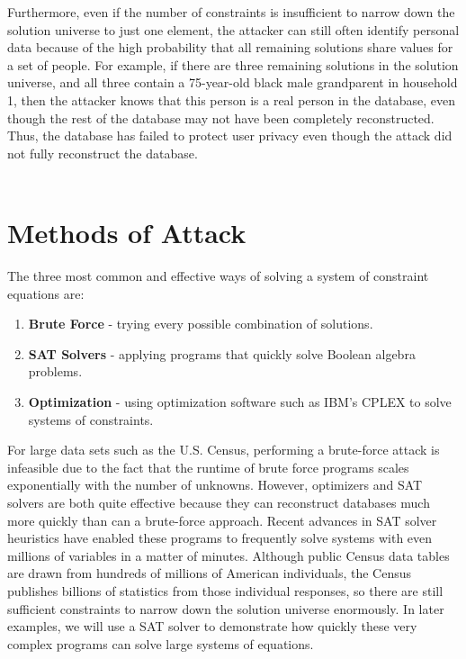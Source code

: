 \documentclass[5p,times,11pt]{elsarticle}
\begin{document}
Furthermore, even if the number of constraints is insufficient to narrow down the solution universe to just one element, the attacker can still often identify personal data because of the high probability that all remaining solutions share values for a set of people. For example, if there are three remaining solutions in the solution universe, and all three contain a 75-year-old black male grandparent in household 1, then the attacker knows that this person is a real person in the database, even though the rest of the database may not have been completely reconstructed. Thus, the database has failed to protect user privacy even though the attack did not fully reconstruct the database.
\\
\\


\section{Methods of Attack}

The three most common and effective ways of solving a
system of constraint equations are:
\begin{enumerate}

\item \textbf{Brute Force} - trying every possible combination of solutions.\\

\item \textbf{SAT Solvers} - applying programs that quickly solve Boolean algebra problems.\\

\item \textbf{Optimization} -  using optimization software such as IBM's CPLEX to solve systems of constraints.

\end{enumerate}

For large data sets such as the U.S. Census, performing a brute-force attack is infeasible due to the fact that the runtime of brute force programs scales exponentially with the number of unknowns. However, optimizers and SAT solvers are both quite effective because they can reconstruct databases much more quickly than can a brute-force approach. Recent advances in SAT solver heuristics have enabled these programs to frequently solve systems with even millions of variables in a matter of minutes. Although public Census data tables are drawn from hundreds of millions of American individuals, the Census publishes billions of statistics from those individual responses, so there are still sufficient constraints to narrow down the solution universe enormously. In later examples, we will use a SAT solver to demonstrate how quickly these very complex programs can solve large systems of equations.
\end{document}
